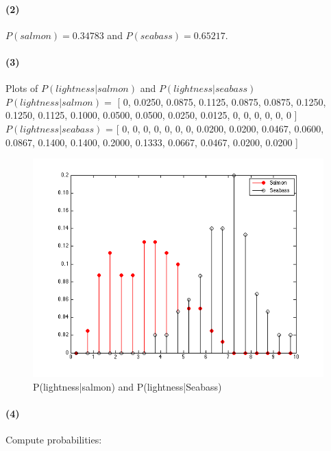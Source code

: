 \documentclass[a4paper]{article}
\begin{document}
%
%
\paragraph{(2) } $P(salmon) = 0.34783$ and $P(seabass) = 0.65217$.

%
%
\paragraph{(3) } Plots of $P(lightness|salmon)$ and $P(lightness|seabass)$ ~\\

$P(lightness|salmon) = $ [
         0,
    0.0250,
    0.0875,
    0.1125,
    0.0875,
    0.0875,
    0.1250,
    0.1250,
    0.1125,
    0.1000,
    0.0500,
    0.0500,
    0.0250,
    0.0125,
         0,
         0,
         0,
         0,
         0,
         0 ]\\

$P(lightness|seabass)$ = [
         0,
         0,
         0,
         0,
         0,
         0,
         0,
    0.0200,
    0.0200,
    0.0467,
    0.0600,
    0.0867,
    0.1400,
    0.1400,
    0.2000,
    0.1333,
    0.0667,
    0.0467,
    0.0200,
    0.0200 ]
\begin{figure}[H]
  \centering
    \includegraphics[scale=.6]{images/conditional_probability_pmfs.png}
  \caption{P(lightness|salmon) and P(lightness|Seabass)}
\end{figure}

%
%
\paragraph{(4) } Compute probabilities: ~\\
\end{document}
